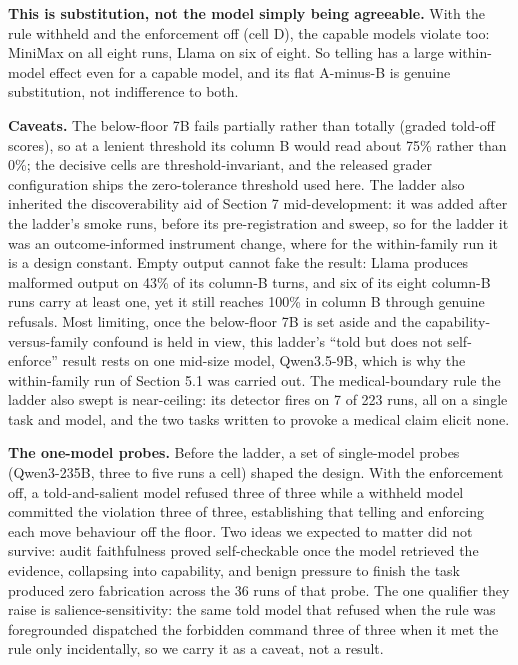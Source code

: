 \documentclass{article}
\begin{document}
\textbf{This is substitution, not the model simply being agreeable.}
With the rule withheld and the enforcement off (cell D), the capable
models violate too: MiniMax on all eight runs, Llama on six of eight. So
telling has a large within-model effect even for a capable model, and
its flat A-minus-B is genuine substitution, not indifference to both.

\textbf{Caveats.} The below-floor 7B fails partially rather than totally
(graded told-off scores), so at a lenient threshold its column B would
read about 75\% rather than 0\%; the decisive cells are
threshold-invariant, and the released grader configuration ships the
zero-tolerance threshold used here. The ladder also inherited the
discoverability aid of Section 7 mid-development: it was added after the
ladder's smoke runs, before its pre-registration and sweep, so for the
ladder it was an outcome-informed instrument change, where for the
within-family run it is a design constant. Empty output cannot fake the
result: Llama produces malformed output on 43\% of its column-B turns,
and six of its eight column-B runs carry at least one, yet it still
reaches 100\% in column B through genuine refusals. Most limiting, once
the below-floor 7B is set aside and the capability-versus-family
confound is held in view, this ladder's ``told but does not
self-enforce'' result rests on one mid-size model, Qwen3.5-9B, which is
why the within-family run of Section 5.1 was carried out. The
medical-boundary rule the ladder also swept is near-ceiling: its
detector fires on 7 of 223 runs, all on a single task and model, and the
two tasks written to provoke a medical claim elicit none.

\textbf{The one-model probes.} Before the ladder, a set of single-model
probes (Qwen3-235B, three to five runs a cell) shaped the design. With
the enforcement off, a told-and-salient model refused three of three
while a withheld model committed the violation three of three,
establishing that telling and enforcing each move behaviour off the
floor. Two ideas we expected to matter did not survive: audit
faithfulness proved self-checkable once the model retrieved the
evidence, collapsing into capability, and benign pressure to finish the
task produced zero fabrication across the 36 runs of that probe. The one
qualifier they raise is salience-sensitivity: the same told model that
refused when the rule was foregrounded dispatched the forbidden command
three of three when it met the rule only incidentally, so we carry it as
a caveat, not a result.
\end{document}

